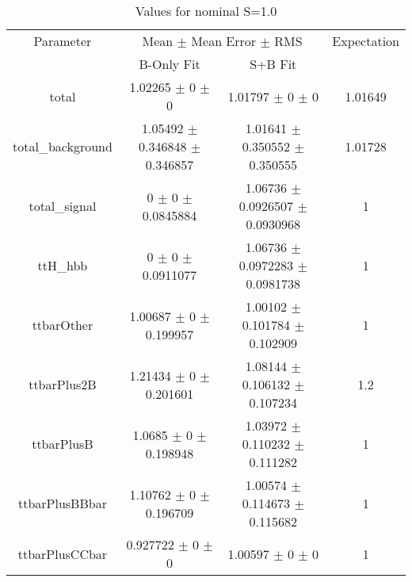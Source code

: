 \begin{table}
\centering
\caption{Values for nominal S=1.0}
\begin{tabular}{cccc}
\toprule
Parameter & \multicolumn{2}{c}{Mean $\pm$ Mean Error $\pm$ RMS} & Expectation\\
 & B-Only Fit & S+B Fit & \\
\midrule
total & \num{1.02265} $\pm$ \num{0} $\pm$ \num{0} & \num{1.01797} $\pm$ \num{0} $\pm$ \num{0} & \num{1.01649}\\
total\_background & \num{1.05492} $\pm$ \num{0.346848} $\pm$ \num{0.346857} & \num{1.01641} $\pm$ \num{0.350552} $\pm$ \num{0.350555} & \num{1.01728}\\
total\_signal & \num{0} $\pm$ \num{0} $\pm$ \num{0.0845884} & \num{1.06736} $\pm$ \num{0.0926507} $\pm$ \num{0.0930968} & \num{1}\\
ttH\_hbb & \num{0} $\pm$ \num{0} $\pm$ \num{0.0911077} & \num{1.06736} $\pm$ \num{0.0972283} $\pm$ \num{0.0981738} & \num{1}\\
ttbarOther & \num{1.00687} $\pm$ \num{0} $\pm$ \num{0.199957} & \num{1.00102} $\pm$ \num{0.101784} $\pm$ \num{0.102909} & \num{1}\\
ttbarPlus2B & \num{1.21434} $\pm$ \num{0} $\pm$ \num{0.201601} & \num{1.08144} $\pm$ \num{0.106132} $\pm$ \num{0.107234} & \num{1.2}\\
ttbarPlusB & \num{1.0685} $\pm$ \num{0} $\pm$ \num{0.198948} & \num{1.03972} $\pm$ \num{0.110232} $\pm$ \num{0.111282} & \num{1}\\
ttbarPlusBBbar & \num{1.10762} $\pm$ \num{0} $\pm$ \num{0.196709} & \num{1.00574} $\pm$ \num{0.114673} $\pm$ \num{0.115682} & \num{1}\\
ttbarPlusCCbar & \num{0.927722} $\pm$ \num{0} $\pm$ \num{0} & \num{1.00597} $\pm$ \num{0} $\pm$ \num{0} & \num{1}\\
\bottomrule
\end{tabular}
\end{table}